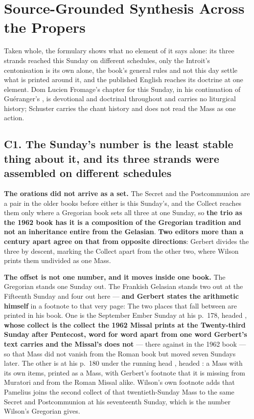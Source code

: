 \sectionguard
\section*{Source-Grounded Synthesis Across the Propers}

Taken whole, the formulary shows what no element of it says alone: its three
strands reached this Sunday on different schedules, only the Introit's
centonisation is its own alone, the book's general rules and not this day settle
what is printed around it, and the published English reaches its doctrine at one
element. Dom Lucien Fromage's chapter for this Sunday, in his
continuation of Guéranger's , is devotional
and doctrinal throughout and carries no liturgical history; Schuster carries the
chant history and does not read the Mass as one action.

\subsection*{C1. The Sunday's number is the least stable thing about it, and its three strands were assembled on different schedules}

\textbf{The orations did not arrive as a set.} The Secret and the Postcommunion
are a pair in the older books before either is this Sunday's, and the Collect
reaches them only where a Gregorian book sets all three at one Sunday, so
\textbf{the trio as the 1962 book has it is a composition of the Gregorian
tradition and not an inheritance entire from the Gelasian}. \textbf{Two editors
more than a century apart agree on that from opposite directions}: Gerbert
divides the three by descent, marking the Collect apart from the other two,
where Wilson prints them undivided as one Mass.

\textbf{The offset is not one number, and it moves inside one book.} The
Gregorian stands one Sunday out. The Frankish Gelasian stands two out at the
Fifteenth Sunday and four out here --- \textbf{and Gerbert states the arithmetic
himself} in a footnote to that very page:  The two places that fall between are
printed in his book. One is the September Ember Sunday at his p.~178, headed
, \textbf{whose collect  is the collect the 1962 Missal prints at the
Twenty-third Sunday after Pentecost, word for word apart from one word
Gerbert's text carries and the Missal's does not} ---  there against  in the 1962 book
--- so that Mass did not vanish from the Roman book but moved seven Sundays
later. The other is at his p.~180 under the running head , headed
: a Mass with its own items, printed as a Mass, with
Gerbert's footnote that it is missing from Muratori and from the Roman Missal
alike. Wilson's own footnote adds that Pamelius joins the second collect of that
twentieth-Sunday Mass to the same Secret and Postcommunion at his seventeenth
Sunday, which is the number Wilson's Gregorian gives.

